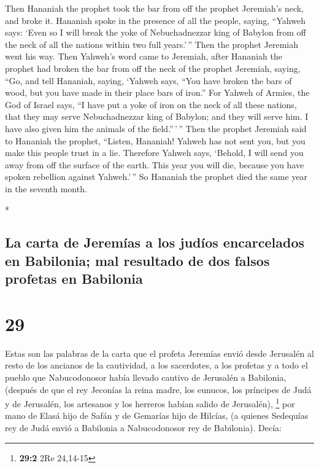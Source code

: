 \begin{paracol}{2}
\begin{otherlanguage}{english}
 Then Hananiah the prophet took the bar from off the
prophet Jeremiah's neck, and broke it.  Hananiah spoke in
the presence of all the people, saying, ``Yahweh says: `Even so I will
break the yoke of Nebuchadnezzar king of Babylon from off the neck of
all the nations within two full years.'\,'' Then the prophet Jeremiah
went his way.  Then Yahweh's word came to Jeremiah, after
Hananiah the prophet had broken the bar from off the neck of the prophet
Jeremiah, saying,  ``Go, and tell Hananiah, saying,
`Yahweh says, ``You have broken the bars of wood, but you have made in
their place bars of iron.''  For Yahweh of Armies, the
God of Israel says, ``I have put a yoke of iron on the neck of all these
nations, that they may serve Nebuchadnezzar king of Babylon; and they
will serve him. I have also given him the animals of the field.''\,'\,''
 Then the prophet Jeremiah said to Hananiah the prophet,
``Listen, Hananiah! Yahweh has not sent you, but you make this people
trust in a lie.  Therefore Yahweh says, `Behold, I will
send you away from off the surface of the earth. This year you will die,
because you have spoken rebellion against Yahweh.'\,'' 
So Hananiah the prophet died the same year in the seventh month.

\end{otherlanguage}

\switchcolumn[0]*

\hypertarget{la-carta-de-jeremuxedas-a-los-juduxedos-encarcelados-en-babilonia-mal-resultado-de-dos-falsos-profetas-en-babilonia}{%
\subsection{La carta de Jeremías a los judíos encarcelados en Babilonia;
mal resultado de dos falsos profetas en
Babilonia}\label{la-carta-de-jeremuxedas-a-los-juduxedos-encarcelados-en-babilonia-mal-resultado-de-dos-falsos-profetas-en-babilonia}}

\hypertarget{section-56}{%
\section{29}\label{section-56}}

 Estas son las palabras de la carta que el profeta
Jeremías envió desde Jerusalén al resto de los ancianos de la
cautividad, a los sacerdotes, a los profetas y a todo el pueblo que
Nabucodonosor había llevado cautivo de Jerusalén a Babilonia,
 (después de que el rey Jeconías la reina madre, los
eunucos, los príncipes de Judá y de Jerusalén, los artesanos y los
herreros habían salido de Jerusalén), \footnote{\textbf{29:2} 2Re
  24,14-15}  por mano de Elasá hijo de Safán y de Gemarías
hijo de Hilcías, (a quienes Sedequías rey de Judá envió a Babilonia a
Nabucodonosor rey de Babilonia). Decía:


\end{paracol}
